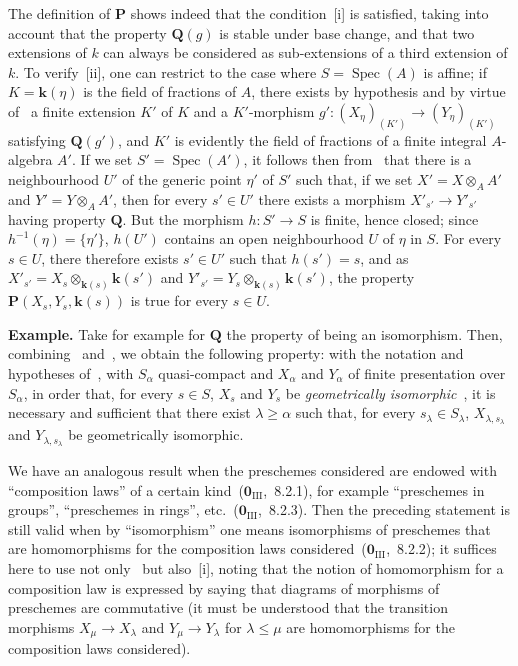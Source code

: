 The definition of $\mathbf{P}$ shows indeed that the condition~[i] is satisfied, taking into account that the property $\mathbf{Q}(g)$ is stable under base change, and that two extensions of $k$ can always be considered as sub-extensions of a third extension of $k$.
To verify~[ii], one can restrict to the case where $S=\operatorname{Spec}(A)$ is affine; if $K=\mathbf{k}(\eta)$ is the field of fractions of $A$, there exists by hypothesis and by virtue of~ a finite extension $K'$ of $K$ and a $K'$-morphism $g':(X_\eta)_{(K')}\to(Y_\eta)_{(K')}$ satisfying $\mathbf{Q}(g')$, and $K'$ is evidently the field of fractions of a finite integral $A$-algebra $A'$.
If we set $S'=\operatorname{Spec}(A')$, it follows then from~ that there is a neighbourhood $U'$ of the generic point $\eta'$ of $S'$ such that, if we set $X'=X\otimes_A A'$ and $Y'=Y\otimes_A A'$, then for every $s'\in U'$ there exists a morphism $X'_{s'}\to Y'_{s'}$ having property $\mathbf{Q}$.
But the morphism $h:S'\to S$ is finite, hence closed; since $h^{-1}(\eta)=\{\eta'\}$, $h(U')$ contains an open neighbourhood $U$ of $\eta$ in $S$.
For every $s\in U$, there therefore exists $s'\in U'$ such that $h(s')=s$, and as $X'_{s'}=X_s\otimes_{\mathbf{k}(s)}\mathbf{k}(s')$ and $Y'_{s'}=Y_s\otimes_{\mathbf{k}(s)}\mathbf{k}(s')$, the property $\mathbf{P}(X_s,Y_s,\mathbf{k}(s))$ is true for every $s\in U$.

\begin{env}[9.3.6]
\label{IV.9.3.6}
\textbf{Example.}
Take for example for $\mathbf{Q}$ the property of being an isomorphism.
Then, combining~ and~, we obtain the following property: with the notation and hypotheses of~, with $S_\alpha$ quasi-compact and $X_\alpha$ and $Y_\alpha$ of finite presentation over $S_\alpha$, in order that, for every $s\in S$, $X_s$ and $Y_s$ be \emph{geometrically isomorphic}~, it is necessary and sufficient that there exist $\lambda\geqslant\alpha$ such that, for every $s_\lambda\in S_\lambda$, $X_{\lambda,s_\lambda}$ and $Y_{\lambda,s_\lambda}$ be geometrically isomorphic.
\end{env}

We have an analogous result when the preschemes considered are endowed with ``composition laws'' of a certain kind~($\mathbf{0}_{\mathrm{III}}$,~8.2.1), for example ``preschemes in groups'', ``preschemes in rings'', etc.~($\mathbf{0}_{\mathrm{III}}$,~8.2.3).
Then the preceding statement is still valid when by ``isomorphism'' one means isomorphisms of preschemes that are homomorphisms for the composition laws considered~($\mathbf{0}_{\mathrm{III}}$,~8.2.2); it suffices here to use not only~ but also~[i], noting that the notion of homomorphism for a composition law is expressed by saying that diagrams of morphisms of preschemes are commutative (it must be understood that the transition morphisms $X_\mu\to X_\lambda$ and $Y_\mu\to Y_\lambda$ for $\lambda\leqslant\mu$ are homomorphisms for the composition laws considered).

